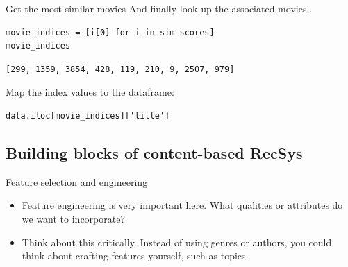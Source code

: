 \documentclass[handout]{beamer}
\begin{document}
\begin{frame}[fragile]{Get the most similar movies}
	And finally look up the associated movies..
	\pause
	\begin{verbatim}
movie_indices = [i[0] for i in sim_scores]
movie_indices
	\end{verbatim}
	\pause
	\begin{verbatim}
[299, 1359, 3854, 428, 119, 210, 9, 2507, 979]
	\end{verbatim}
	\pause
	Map the index values to the dataframe:
	\begin{verbatim}
data.iloc[movie_indices]['title']
	\end{verbatim}
	\pause
	\begin{table}[]
	\end{table}
\end{frame}




\subsection*{Building blocks of content-based RecSys}

\begin{frame}
	\begin{block}{Feature selection and engineering}
		\begin{itemize}
			\item Feature engineering is very important here. What qualities or attributes do we want to incorporate?
			\pause
			\item Think about this critically. Instead of using genres or authors, you could think about crafting features yourself, such as topics. 
			\pause
		\end{itemize}
	\end{block}
\end{frame}
\end{document}
